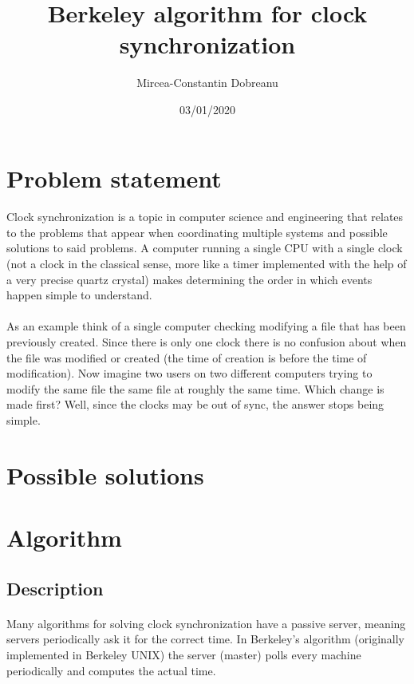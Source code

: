 \documentclass[12pt]{article}
\title{Berkeley algorithm for clock synchronization}
\author{Mircea-Constantin Dobreanu}
\date{03/01/2020}
\begin{document}
\maketitle


\section{Problem statement}

\paragraph{}
Clock synchronization is a topic in computer science and engineering that relates to the problems that appear when coordinating multiple systems and possible solutions to said problems. A computer running a single CPU with a single clock (not a clock in the classical sense, more like a timer implemented with the help of a very precise quartz crystal) makes determining the order in which events happen simple to understand. 
\paragraph{}
As an example think of a single computer checking modifying a file that has been previously created. Since there is only one clock there is no confusion about when the file was modified or created (the time of creation is before the time of modification). Now imagine two users on two different computers trying to modify the same file the same file at roughly the same time. Which change is made first? Well, since the clocks may be out of sync, the answer stops being simple.

\section{Possible solutions}

\section{Algorithm}

\subsection{Description}
\paragraph{}
Many algorithms for solving clock synchronization have a passive server, meaning servers periodically ask it for the correct time. In Berkeley's algorithm (originally implemented in Berkeley UNIX) the server (master) polls every machine periodically and computes the actual time.
\end{document}
